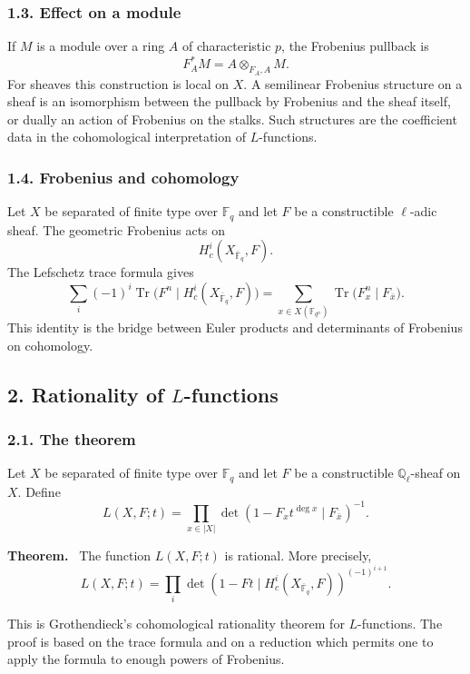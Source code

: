 \documentclass[14pt]{extarticle}
\newcommand{\QQ}{\mathbb Q}
\newcommand{\FF}{\mathbb F}
\newenvironment{statement}[1]{\par\medskip\noindent\textbf{#1.}\ }{\par\medskip}
\begin{document}
\subsubsection*{1.3. Effect on a module}

If $M$ is a module over a ring $A$ of characteristic $p$, the Frobenius pullback is
\[
   F_A^*M=A\otimes_{F_A,A}M.
\]
For sheaves this construction is local on $X$. A semilinear Frobenius structure on a sheaf is an isomorphism between the pullback by Frobenius and the sheaf itself, or dually an action of Frobenius on the stalks. Such structures are the coefficient data in the cohomological interpretation of $L$-functions.

\subsubsection*{1.4. Frobenius and cohomology}

Let $X$ be separated of finite type over $\FF_q$ and let $F$ be a constructible $\ell$-adic sheaf. The geometric Frobenius acts on
\[
   H^i_c(X_{\overline{\FF}_q},F).
\]
The Lefschetz trace formula gives
\[
   \sum_i(-1)^i\operatorname{Tr}\bigl(F^n\mid H^i_c(X_{\overline{\FF}_q},F)\bigr)
     =\sum_{x\in X(\FF_{q^n})}\operatorname{Tr}\bigl(F_x^n\mid F_{\bar x}\bigr).
\]
This identity is the bridge between Euler products and determinants of Frobenius on cohomology.

\subsection*{2. Rationality of $L$-functions}

\subsubsection*{2.1. The theorem}

Let $X$ be separated of finite type over $\FF_q$ and let $F$ be a constructible $\QQ_\ell$-sheaf on $X$. Define
\[
   L(X,F;t)=\prod_{x\in |X|}
      \det(1-F_x t^{\deg x}\mid F_{\bar x})^{-1}.
\]

\begin{statement}{Theorem}
The function $L(X,F;t)$ is rational. More precisely,
\[
   L(X,F;t)=\prod_i
      \det(1-Ft\mid H^i_c(X_{\overline{\FF}_q},F))^{(-1)^{i+1}}.
\]
\end{statement}

This is Grothendieck's cohomological rationality theorem for $L$-functions. The proof is based on the trace formula and on a reduction which permits one to apply the formula to enough powers of Frobenius.
\end{document}

